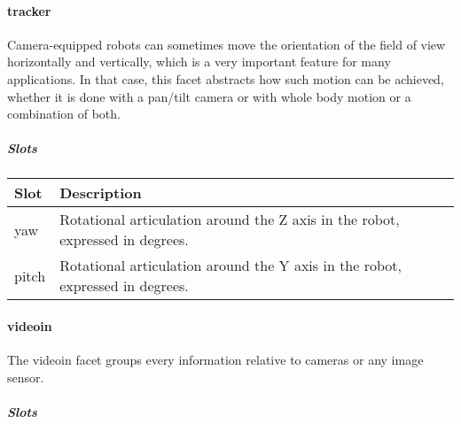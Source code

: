 \documentclass[a4paper]{article}
\begin{document}
\paragraph{tracker}

{\sffamily
Camera-equipped robots can sometimes move the orientation of the field
of view horizontally and vertically, which is a very important feature
for many applications. In that case, this facet abstracts how such
motion can be achieved, whether it is done with a pan/tilt camera or
with whole body motion or a combination of both.}

\subparagraph{Slots}

\begin{flushleft}
\tablehead{}
\begin{supertabular}{|m{3.293cm}|m{11.997cm}|}
\hline
\sffamily\bfseries Slot &
\sffamily\bfseries Description\\\hline
yaw &
\sffamily Rotational articulation around the Z
axis in the robot, expressed in degrees.\\\hline
pitch &
\sffamily Rotational articulation around the Y
axis in the robot, expressed in degrees.\\\hline
\end{supertabular}
\end{flushleft}
\paragraph{videoin}

{\sffamily
The videoin facet groups every information relative to cameras or any
image sensor. }

\subparagraph{Slots}
\end{document}
